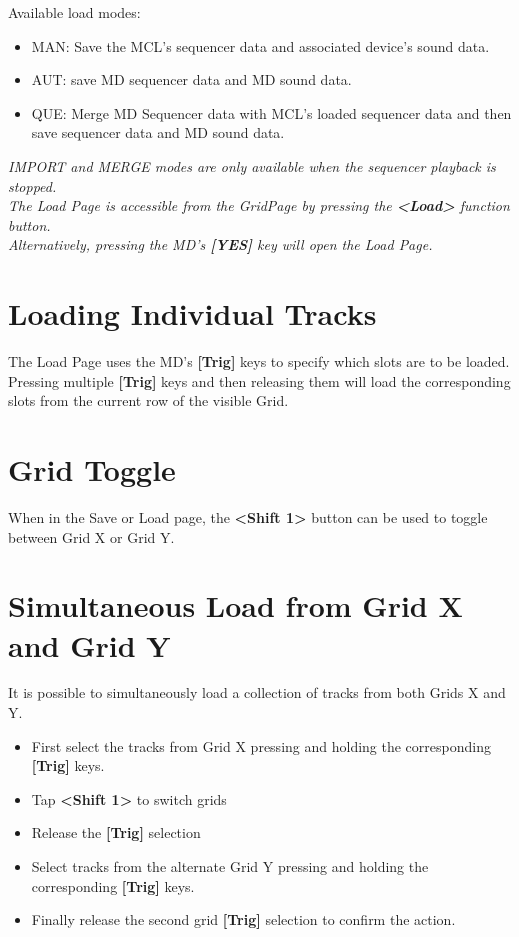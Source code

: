 Available load modes:
\begin{itemize}
    \item MAN: Save the MCL's sequencer data and associated device's sound data.
    \item AUT: save MD sequencer data and MD sound data.
    \item QUE: Merge MD Sequencer data with MCL's loaded sequencer data and then save sequencer data and MD sound data.
\end{itemize}
\textit{IMPORT and MERGE modes are only available when the sequencer playback is stopped.}
\\
\textit{The Load Page is accessible from the GridPage by pressing the  \textbf{<Load>} function button.\\
Alternatively, pressing the MD's \textbf{[YES]} key will open the Load Page.}
\newpage
\section{Loading Individual Tracks}
The Load Page uses the MD's \textbf{[Trig]} keys to specify which slots are to be loaded. Pressing multiple \textbf{[Trig]} keys and then releasing them will load the corresponding slots from the current row of the visible Grid.
\section{Grid Toggle}
When in the Save or Load page, the \textbf{<Shift 1>} button can be used to toggle between Grid X or Grid Y.
\section{Simultaneous Load from Grid X and Grid Y}
It is possible to simultaneously load a collection of tracks from both Grids X and Y. 
\begin{itemize}
\item First select the tracks from Grid X pressing and holding the corresponding \textbf{[Trig]} keys.
\item Tap \textbf{<Shift 1>} to switch grids
\item Release the \textbf{[Trig]} selection
\item Select tracks from the alternate Grid Y pressing and holding the corresponding \textbf{[Trig]} keys. 
\item Finally release the second grid \textbf{[Trig]} selection to confirm the action. 
\end{itemize}

